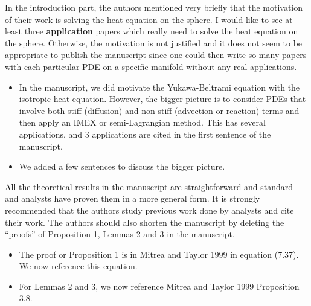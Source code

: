 \documentclass[11pt]{article}
\newcommand{\comment}[1]{{\color{blue} #1}}
\begin{document}
\comment{In the introduction part, the authors mentioned very briefly
that the motivation of their work is solving the heat equation on the
sphere.  I would like to see at least three {\bf application} papers
which really need to solve the heat equation on the sphere. Otherwise,
the motivation is not justified and it does not seem to be appropriate
to publish the manuscript since one could then write so many papers
with each particular PDE on a specific manifold without any real
applications.}
\begin{itemize}
  \item In the manuscript, we did motivate the Yukawa-Beltrami equation
  with the isotropic heat equation.  However, the bigger picture is to
  consider PDEs that involve both stiff (diffusion) and non-stiff
  (advection or reaction) terms and then apply an IMEX or
  semi-Lagrangian method.  This has several applications, and 3
  applications are cited in the first sentence of the manuscript.
  \item We added a few sentences to discuss the bigger picture.
\end{itemize}

\comment{All the theoretical results in the manuscript are
straightforward and standard and analysts have proven them in a more
general form. It is strongly recommended that the authors study
previous work done by analysts and cite their work. The authors should
also shorten the manuscript by deleting the “proofs” of Proposition 1,
Lemmas 2 and 3 in the manuscript.}
\begin{itemize}
  \item The proof or Proposition 1 is in Mitrea and Taylor 1999 in
  equation (7.37).  We now reference this equation.
  \item For Lemmas 2 and 3, we now reference Mitrea and Taylor 1999
  Proposition 3.8.
\end{itemize}
\end{document}
